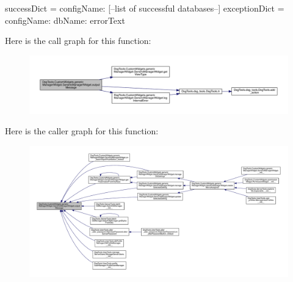 \begin{DoxyVerb}successDict = {configName: [--list of successful databases--]}
exceptionDict = {configName: {dbName: errorText}}
\end{DoxyVerb}
 Here is the call graph for this function\+:
\nopagebreak
\begin{figure}[H]
\begin{center}
\leavevmode
\includegraphics[width=350pt]{class_dsg_tools_1_1_custom_widgets_1_1generic_manager_widget_1_1_generic_manager_widget_aef0d68dae266dd315aa07d964476108d_cgraph}
\end{center}
\end{figure}
Here is the caller graph for this function\+:
\nopagebreak
\begin{figure}[H]
\begin{center}
\leavevmode
\includegraphics[width=350pt]{class_dsg_tools_1_1_custom_widgets_1_1generic_manager_widget_1_1_generic_manager_widget_aef0d68dae266dd315aa07d964476108d_icgraph}
\end{center}
\end{figure}
\mbox{\label{class_dsg_tools_1_1_custom_widgets_1_1generic_manager_widget_1_1_generic_manager_widget_ab68bb67376c927cd7f951ab2b0a52fd6}} 
